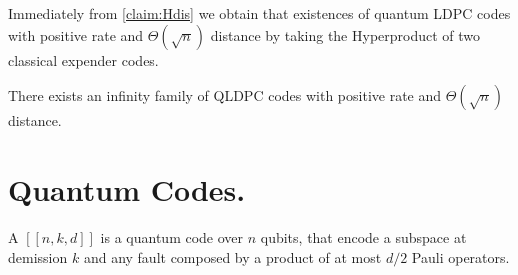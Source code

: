 Immediately from \cref{claim:Hdis} we obtain that existences of quantum LDPC codes with positive rate and $\Theta\left( \sqrt{n} \right)$ distance by taking the Hyperproduct of two classical expender codes.   

\begin{theorem}
  There exists an infinity family of QLDPC codes with positive rate and $\Theta(\sqrt{n})$ distance.   
\end{theorem}

\section{Quantum Codes.}
\begin{definition}
  A $\left[\left[ n,k,d \right]\right]$ is a quantum code over $n$ qubits, that encode a subspace at demission $k$ and any fault composed by a product of at most $d/2$ Pauli operators. 
\end{definition}





